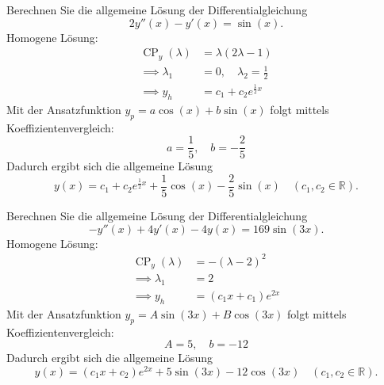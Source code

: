 \documentclass[parskip=full]{scrartcl}
\DeclareMathOperator{\cp}{CP}
\begin{document}
Berechnen Sie die allgemeine Lösung der Differentialgleichung
\begin{displaymath}
  2y''(x) - y'(x) = \sin(x).
\end{displaymath}
Homogene Lösung:
\begin{align*}
  \cp_y(\lambda) &= \lambda(2\lambda - 1)\\
  \implies \lambda_1 &= 0, \quad \lambda_2 = \frac{1}{2}\\
  \implies y_h &= c_1 + c_2 e^{\frac{1}{2} x}
\end{align*}
Mit der Ansatzfunktion $y_p = a \cos(x) + b\sin(x)$ folgt mittels Koeffizientenvergleich:
\begin{displaymath}
  a = \frac{1}{5}, \quad b = -\frac{2}{5}
\end{displaymath}
Dadurch ergibt sich die allgemeine Lösung
\begin{displaymath}
  y(x) = c_1 + c_2 e^{\frac{1}{2} x} + \frac{1}{5}\cos(x) - \frac{2}{5}\sin(x) \quad (c_1, c_2 \in \mathbb{R}).
\end{displaymath}

Berechnen Sie die allgemeine Lösung der Differentialgleichung
\begin{displaymath}
  -y''(x) + 4y'(x) - 4y(x) = 169 \sin(3x). 
\end{displaymath}
Homogene Lösung:
\begin{align*}
  \cp_y(\lambda) &= -(\lambda - 2)^2\\
  \implies \lambda_1 &= 2\\
  \implies y_h &= (c_1 x + c_1)e^{2x}
\end{align*}
Mit der Ansatzfunktion $y_p = A\sin(3x) + B\cos(3x)$ folgt mittels Koeffizientenvergleich:
\begin{displaymath}
  A = 5, \quad b = -12
\end{displaymath}
Dadurch ergibt sich die allgemeine Lösung
\begin{displaymath}
  y(x) = (c_1 x + c_2)e^{2x} + 5\sin(3x) - 12\cos(3x) \quad (c_1, c_2 \in \mathbb{R}).
\end{displaymath}
\end{document}
